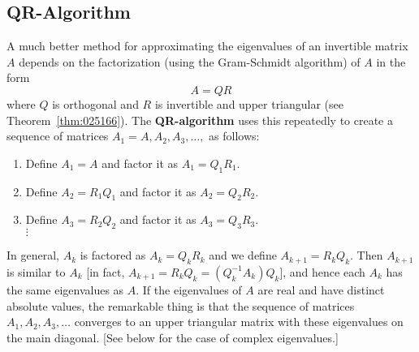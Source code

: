 \subsection*{QR-Algorithm}

A much better method for approximating the eigenvalues of an invertible matrix $A$ depends on the factorization (using the Gram-Schmidt algorithm) of $A$ in the form
\begin{equation*}
A = QR
\end{equation*}
where $Q$ is orthogonal and $R$ is invertible and upper triangular (see Theorem~\ref{thm:025166}). The \textbf{QR-algorithm} uses this repeatedly to create a sequence of matrices $A_{1} =A, A_{2}, A_{3}, \dots,$ as follows:


\begin{enumerate}
\item Define $A_{1} = A$ and factor it as $A_{1} = Q_{1}R_{1}$.

\item Define $A_{2} = R_{1}Q_{1}$ and factor it as $A_{2} = Q_{2}R_{2}$.

\item Define $A_{3} = R_{2}Q_{2}$ and factor it as $A_{3} = Q_{3}R_{3}$. 
\\ \hspace*{4em} $\vdots$


\end{enumerate}

\noindent In general, $A_{k}$ is factored as $A_{k} = Q_{k}R_{k}$ and we define $A_{k + 1} = R_{k}Q_{k}$. Then $A_{k + 1}$ is similar to $A_{k}$ [in fact, $A_{k+1} = R_{k}Q_{k} = (Q_{k}^{-1}A_{k})Q_{k}$], and hence each $A_{k}$ has the same eigenvalues as $A$. If the eigenvalues of $A$ are real and have distinct absolute values, the remarkable thing is that the sequence of matrices $A_{1}, A_{2}, A_{3}, \dots$ converges to an upper triangular matrix with these eigenvalues on the main diagonal. [See below for the case of complex eigenvalues.]

